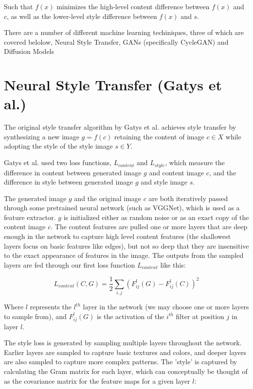 \documentclass[12pt]{article}
\begin{document}
Such that \(f(x)\) minimizes the high-level content difference between \(f(x)\) and \(c\), as well as the lower-level style difference between \(f(x)\) and \(s\).

There are a number of different machine learning techiniques, three of which are covered belolow, Neural Style Transfer, GANs (specifically CycleGAN) and Diffusion Models

\section{Neural Style Transfer (Gatys et al.)}

The original style transfer algorithm by Gatys et al. achieves style transfer 
by synthesizing a new image \(g = f(c)\) retaining the content of image \(c \in X\) while adopting the style of the style image \(s \in Y\). 

Gatys et al. used two loss functions, \(L_{content}\) and \(L_{style}\), which measure the difference in content between generated image \(g\) and content image \(c\), and the difference in style between generated image \(g\) and style image \(s\).

The generated image \(g\) and the original image \(c\) are both iteratively passed through some pretrained neural network (such as VGGNet), which is used as a feature extractor. \(g\) is initialized either as random noise or as an exact copy of the content image \(c\). The content features are pulled one or more layers that are deep enough in the network to capture high level content features (the shallowest layers focus on basic features like edges), but not so deep that they are insensitive to the exact appearance of features in the image. The outputs from the sampled layers are fed through our first loss function \(L_{content}\) like this:

\begin{equation}
    L_{content}(C, G) = \frac{1}{2} \sum_{i, j} \left( F^l_{ij}(G) - F^l_{ij}(C) \right)^2
\end{equation}

Where \(l\) represents the \(l^{th}\) layer in the network (we may choose one or more layers to sample from), and \(F^l_{ij}(G)\) is the activation of the \(i^{th}\) filter at position \(j\) in layer \(l\).

The style loss is generated by sampling multiple layers throughout the network. Earlier layers are sampled to capture basic textures and colors, and deeper layers are also sampled to capture more complex patterns. The 'style' is captured by calculating the Gram matrix for each layer, which can conceptually be thought of as the covariance matrix for the feature maps for a given layer \(l\):
\end{document}
